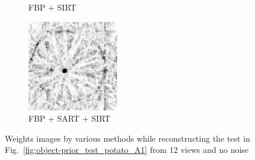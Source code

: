 \documentclass{article}
\begin{document}
\begin{figure}[!h]
\begin{subfigure}[b]{0.2\linewidth}
\captionsetup{labelformat=empty}
        \caption{FBP + SIRT}
    \end{subfigure}
    \quad
        \begin{subfigure}[b]{0.2\linewidth}
        \includegraphics[width=\textwidth]{../images/potato/artefacts/no_noise/weightsIm_fbp_sart_sirt30.png}
\captionsetup{labelformat=empty}
        \caption{FBP + SART + SIRT}
     \end{subfigure}
      \caption{Weights images by various methods while reconstructing the test in Fig.~\ref{fig:object-prior_test_potato_A1} from 12 views and no noise}
\label{fig:weights_no_noise}
\end{figure}
\end{document}

